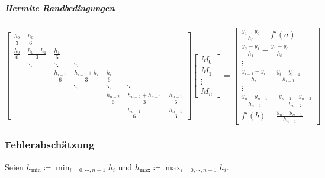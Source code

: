 			\subparagraph{Hermite Randbedingungen}
			\begin{equation*}
				\begin{bmatrix}
					\frac{h_0}{3} & \frac{h_0}{6}       &  \\
					\frac{h_0}{6} & \frac{h_0 + h_1}{3} & \frac{h_1}{6}       &  \\
					              & \ddots              & \ddots              & \ddots                  &  \\
					              &                     & \frac{h_{i - 1}}{6} & \frac{h_{i-1} + h_i}{3} & \frac{h_i}{6}     &  \\
					              &                     &                     & \ddots                  & \ddots            & \ddots                    &  \\
					              &                     &                     &                         & \frac{h_{n-2}}{6} & \frac{h_{n-2}+h_{n-1}}{3} & \frac{h_{n-1}}{6} \\
					              &                     &                     &                         &                   & \frac{h_{n-1}}{6}         & \frac{h_{n-1}}{3}
				\end{bmatrix}
				\begin{bmatrix}
					M_0    \\
					M_1    \\
					\vdots \\
					M_n
				\end{bmatrix}
				=
				\begin{bmatrix}
					\frac{y_1-y_0}{h_0} - f'(a)                                     \\
					\frac{y_2 - y_1}{h_1} - \frac{y_1 - y_0}{h_0}                   \\
					\vdots                                                          \\
					\frac{y_{i+1} - y_i}{h_i} - \frac{y_i - y_{i-1}}{h_{i-1}}       \\
					\vdots                                                          \\
					\frac{y_n - y_{n-1}}{h_{n-1}} - \frac{y_{n-1}-y_{n-2}}{h_{n-2}} \\
					f'(b) - \frac{y_n-y_{n-1}}{h_{n-1}}
				\end{bmatrix}
			\end{equation*}
			
			\subsubsection{Fehlerabschätzung}
				Seien \( h_\textrm{min} \coloneqq \min_{i = 0, \cdots, n - 1} h_i \) und \( h_\textrm{max} \coloneqq \max_{i = 0, \cdots, n - 1} h_i \).
				
